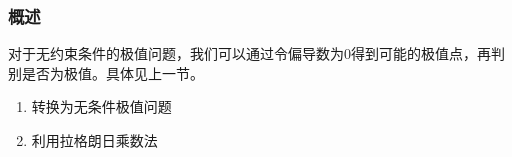 \begin{frame}
\frametitle{概述}

对于无约束条件的极值问题，我们可以通过令偏导数为0得到可能的极值点，再判别是否为极值。具体见上一节。

\end{frame}

\begin{frame}
	
	\begin{enumerate}[1)]
		\item<2-> 转换为无条件极值问题
		\item<2-> 利用拉格朗日乘数法
	\end{enumerate}
	
	
\end{frame}


